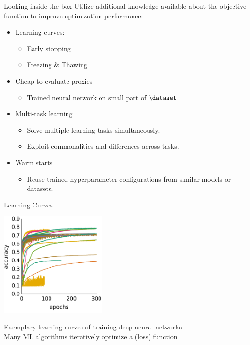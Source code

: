 \begin{frame}{Looking inside the box}
Utilize additional knowledge available about the objective function to improve optimization performance:
\begin{itemize}
    \item Learning curves:
    \begin{itemize}
        \item Early stopping
        \item Freezing \& Thawing
    \end{itemize}
    \item Cheap-to-evaluate proxies
    \begin{itemize}
        \item Trained neural network on small part of $\dataset$ 
    \end{itemize}
    \item Multi-task learning
    \begin{itemize}
        \item Solve multiple learning tasks simultaneously.
        \item Exploit commonalities and differences across tasks.
    \end{itemize}
    \item Warm starts
    \begin{itemize}
        \item Reuse trained hyperparameter configurations from similar models or datasets.
    \end{itemize}
\end{itemize}
\end{frame}
\begin{frame}{Learning Curves}

\centering
\includegraphics[width=0.4\textwidth]{../w07_hpo_speedup/images/intro/learning_curves.png}

Exemplary learning curves of training deep neural networks\\
Many ML algorithms iteratively optimize a (loss) function

\end{frame}
